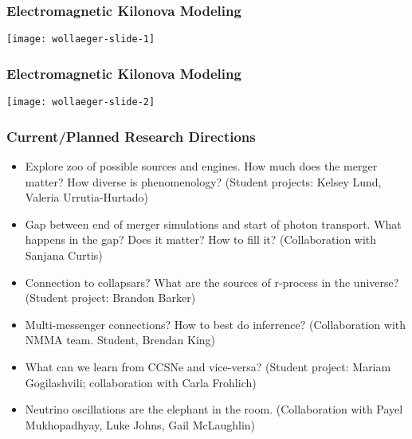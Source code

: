 \documentclass[]{beamer}
\begin{document}
\begin{frame}
  \frametitle{Electromagnetic Kilonova Modeling}
  \begin{center}
    \texttt{[image: wollaeger-slide-1]}
  \end{center}
\end{frame}

\begin{frame}
  \frametitle{Electromagnetic Kilonova Modeling}
  \begin{center}
    \texttt{[image: wollaeger-slide-2]}
  \end{center}
\end{frame}

\begin{frame}
  \frametitle{Current/Planned Research Directions}
  \begin{itemize}
  \item Explore zoo of possible sources and engines. How much does the
    merger matter? How diverse is phenomenology? (Student projects:
    Kelsey Lund, Valeria Urrutia-Hurtado)
  \item Gap between end of merger simulations and start of photon
    transport. What happens in the gap? Does it matter? How to fill
    it? (Collaboration with Sanjana Curtis)
  \item Connection to collapsars? What are the sources of r-process in
    the universe? (Student project: Brandon Barker)
  \item Multi-messenger connections? How to best do inferrence?
    (Collaboration with NMMA team. Student, Brendan King)
  \item What can we learn from CCSNe and vice-versa? (Student project:
    Mariam Gogilashvili; collaboration with Carla Frohlich)
  \item Neutrino oscillations are the elephant in the
    room. (Collaboration with Payel Mukhopadhyay, Luke Johns, Gail
    McLaughlin)
  \end{itemize}
\end{frame}
\end{document}
